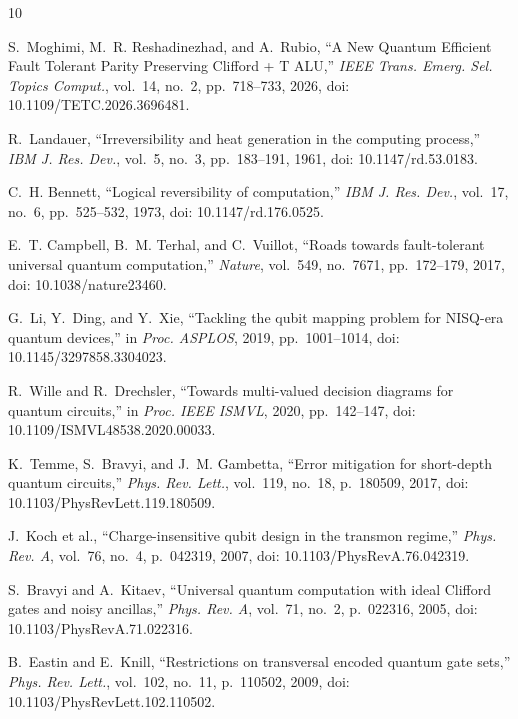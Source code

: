 \documentclass[10pt,twocolumn,letterpaper]{article}
\begin{document}
\begin{thebibliography}{10}
\scriptsize
\setlength{\itemsep}{0.8pt plus 0.2pt}
\setlength{\parskip}{0pt}

S.~Moghimi, M.~R. Reshadinezhad, and A.~Rubio, ``A New Quantum Efficient Fault Tolerant Parity Preserving Clifford + T ALU,'' \emph{IEEE Trans. Emerg. Sel. Topics Comput.}, vol.~14, no.~2, pp.~718--733, 2026, doi: 10.1109/TETC.2026.3696481.

R.~Landauer, ``Irreversibility and heat generation in the computing process,'' \emph{IBM J. Res. Dev.}, vol.~5, no.~3, pp.~183--191, 1961, doi: 10.1147/rd.53.0183.

C.~H. Bennett, ``Logical reversibility of computation,'' \emph{IBM J. Res. Dev.}, vol.~17, no.~6, pp.~525--532, 1973, doi: 10.1147/rd.176.0525.

E.~T. Campbell, B.~M. Terhal, and C.~Vuillot, ``Roads towards fault-tolerant universal quantum computation,'' \emph{Nature}, vol.~549, no.~7671, pp.~172--179, 2017, doi: 10.1038/nature23460.

G.~Li, Y.~Ding, and Y.~Xie, ``Tackling the qubit mapping problem for NISQ-era quantum devices,'' in \emph{Proc. ASPLOS}, 2019, pp.~1001--1014, doi: 10.1145/3297858.3304023.

R.~Wille and R.~Drechsler, ``Towards multi-valued decision diagrams for quantum circuits,'' in \emph{Proc. IEEE ISMVL}, 2020, pp.~142--147, doi: 10.1109/ISMVL48538.2020.00033.

K.~Temme, S.~Bravyi, and J.~M. Gambetta, ``Error mitigation for short-depth quantum circuits,'' \emph{Phys. Rev. Lett.}, vol.~119, no.~18, p.~180509, 2017, doi: 10.1103/PhysRevLett.119.180509.

J.~Koch et al., ``Charge-insensitive qubit design in the transmon regime,'' \emph{Phys. Rev. A}, vol.~76, no.~4, p.~042319, 2007, doi: 10.1103/PhysRevA.76.042319.

S.~Bravyi and A.~Kitaev, ``Universal quantum computation with ideal Clifford gates and noisy ancillas,'' \emph{Phys. Rev. A}, vol.~71, no.~2, p.~022316, 2005, doi: 10.1103/PhysRevA.71.022316.

B.~Eastin and E.~Knill, ``Restrictions on transversal encoded quantum gate sets,'' \emph{Phys. Rev. Lett.}, vol.~102, no.~11, p.~110502, 2009, doi: 10.1103/PhysRevLett.102.110502.

\end{thebibliography}
\end{document}
